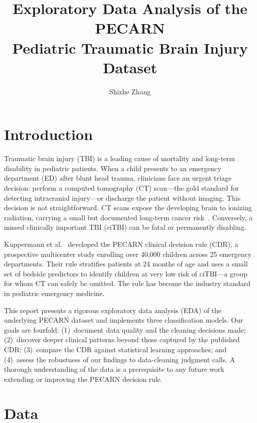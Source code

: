 \documentclass[10pt,letterpaper]{article}
\title{Exploratory Data Analysis of the PECARN\\
Pediatric Traumatic Brain Injury Dataset\\
}
\author{Shizhe Zhang}
\date{}
\begin{document}
\maketitle

\section{Introduction}
\label{introduction}

Traumatic brain injury (TBI) is a leading cause of mortality and long-term disability in pediatric
patients.
When a child presents to an emergency department (ED) after blunt head trauma, clinicians face
an urgent triage decision: perform a computed tomography (CT) scan---the gold standard for detecting
intracranial injury---or discharge the patient without imaging.
This decision is not straightforward.
CT scans expose the developing brain to ionizing radiation, carrying a small but documented
long-term cancer risk~\cite{kuppermann2009}.
Conversely, a missed clinically important TBI (ciTBI) can be fatal or permanently disabling.

Kuppermann et al.~\cite{kuppermann2009} developed the PECARN clinical decision rule (CDR), a
prospective multicenter study enrolling over 40,000 children across 25 emergency departments.
Their rule stratifies patients at 24 months of age and uses a small set of bedside predictors to
identify children at very low risk of ciTBI---a group for whom CT can safely be omitted.
The rule has become the industry standard in pediatric emergency medicine.

This report presents a rigorous exploratory data analysis (EDA) of the underlying PECARN dataset
and implements three classification models.
Our goals are fourfold:
(1)~document data quality and the cleaning decisions made;
(2)~discover deeper clinical patterns beyond those captured by the published CDR;
(3)~compare the CDR against statistical learning approaches; and
(4)~assess the robustness of our findings to data-cleaning judgment calls.
A thorough understanding of the data is a prerequisite to any future work extending or improving
the PECARN decision rule.

\section{Data}
\label{data}
\end{document}
